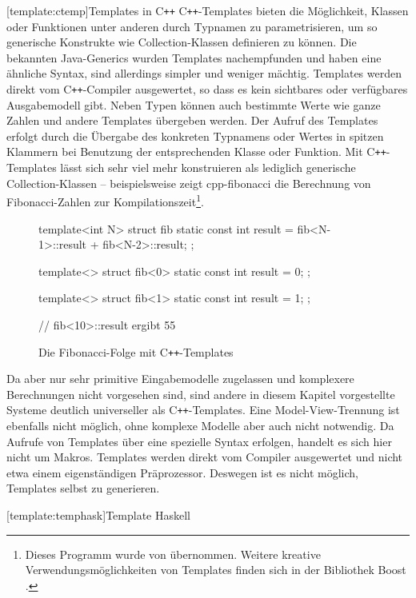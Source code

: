 \documentclass[12pt, a4paper, bibgerm]{scrbook}
\newenvironment{DIFnomarkup}{}{}
\newcommand\lsection{}
\newcommand\abb{}
\newcommand{\cpp}{C\texttt{++}}
\begin{document}
\lsection[template:ctemp]{Templates in \cpp{}} \cpp{}-Templates bieten
die Möglichkeit, Klassen oder Funktionen unter anderen durch Typnamen zu
parametrisieren, um so generische Konstrukte wie Collection-Klassen
definieren zu können. Die bekannten Java-Generics \cite{JavaGenerics}
wurden Templates nachempfunden und haben eine ähnliche Syntax, sind
allerdings simpler und weniger mächtig. Templates werden direkt vom
\cpp{}-Compiler ausgewertet, so dass es kein sichtbares oder verfügbares
Ausgabemodell gibt. Neben Typen können auch bestimmte Werte wie ganze
Zahlen und andere Templates übergeben werden. Der Aufruf des Templates
erfolgt durch die Übergabe des konkreten Typnamens oder Wertes in
spitzen Klammern bei Benutzung der entsprechenden Klasse oder
Funktion. Mit \cpp{}-Templates lässt sich sehr viel mehr konstruieren
als lediglich generische Collection-Klassen -- beispielsweise zeigt
\abb{cpp-fibonacci} die Berechnung von Fibonacci-Zahlen zur
Kompilationszeit\footnote{Dieses Programm wurde von \cite{CppFib} übernommen. Weitere kreative
Verwendungsmöglichkeiten von Templates finden sich in der Bibliothek
Boost \cite{Boost}.}.
\begin{figure}
  \centering
  \begin{DIFnomarkup}\begin{code}
template<int N> struct fib {
  static const int result = fib<N-1>::result + fib<N-2>::result;
};

template<> struct fib<0> {
  static const int result = 0;
};

template<> struct fib<1> {
  static const int result = 1;
};

// fib<10>::result ergibt 55
  \end{code}\end{DIFnomarkup}
  \caption{Die Fibonacci-Folge mit \cpp{}-Templates}
  \label{magicl:fig:cpp-fibonacci}
\end{figure}
Da aber nur sehr primitive Eingabemodelle zugelassen und komplexere
Berechnungen nicht vorgesehen sind, sind andere in diesem Kapitel
vorgestellte Systeme deutlich universeller als \cpp{}-Templates. Eine
Model-View-Trennung ist ebenfalls nicht möglich, ohne komplexe Modelle
aber auch nicht notwendig. Da Aufrufe von Templates über eine spezielle
Syntax erfolgen, handelt es sich hier nicht um Makros. Templates werden
direkt vom Compiler ausgewertet und nicht etwa einem eigenständigen
Präprozessor. Deswegen ist es nicht möglich, Templates selbst zu
generieren.

\lsection[template:temphask]{Template Haskell}
\end{document}
